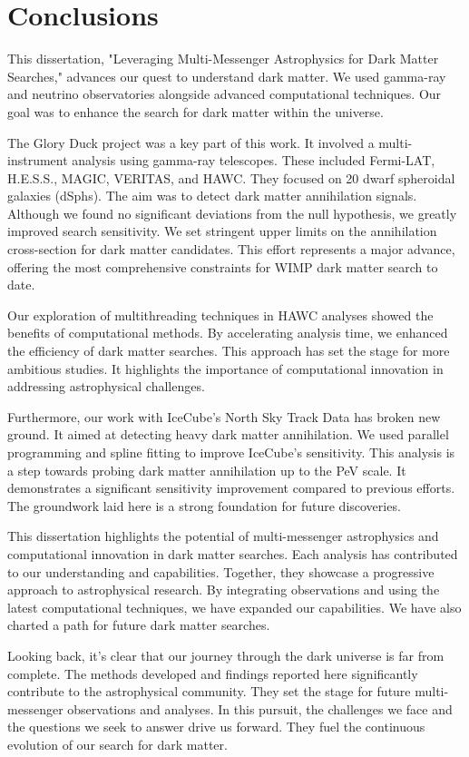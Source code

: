 \section{Conclusions}\label{sec:conclusions}

This dissertation, "Leveraging Multi-Messenger Astrophysics for Dark Matter Searches," advances our quest to understand dark matter. We used gamma-ray and neutrino observatories alongside advanced computational techniques. Our goal was to enhance the search for dark matter within the universe.

The Glory Duck project was a key part of this work. It involved a multi-instrument analysis using gamma-ray telescopes. These included Fermi-LAT, H.E.S.S., MAGIC, VERITAS, and HAWC. They focused on 20 dwarf spheroidal galaxies (dSphs). The aim was to detect dark matter annihilation signals. Although we found no significant deviations from the null hypothesis, we greatly improved search sensitivity. We set stringent upper limits on the annihilation cross-section for dark matter candidates. This effort represents a major advance, offering the most comprehensive constraints for WIMP dark matter search to date.

Our exploration of multithreading techniques in HAWC analyses showed the benefits of computational methods. By accelerating analysis time, we enhanced the efficiency of dark matter searches. This approach has set the stage for more ambitious studies. It highlights the importance of computational innovation in addressing astrophysical challenges.

Furthermore, our work with IceCube's North Sky Track Data has broken new ground. It aimed at detecting heavy dark matter annihilation. We used parallel programming and spline fitting to improve IceCube's sensitivity. This analysis is a step towards probing dark matter annihilation up to the PeV scale. It demonstrates a significant sensitivity improvement compared to previous efforts. The groundwork laid here is a strong foundation for future discoveries.

This dissertation highlights the potential of multi-messenger astrophysics and computational innovation in dark matter searches. Each analysis has contributed to our understanding and capabilities. Together, they showcase a progressive approach to astrophysical research. By integrating observations and using the latest computational techniques, we have expanded our capabilities. We have also charted a path for future dark matter searches.

Looking back, it's clear that our journey through the dark universe is far from complete. The methods developed and findings reported here significantly contribute to the astrophysical community. They set the stage for future multi-messenger observations and analyses. In this pursuit, the challenges we face and the questions we seek to answer drive us forward. They fuel the continuous evolution of our search for dark matter.
